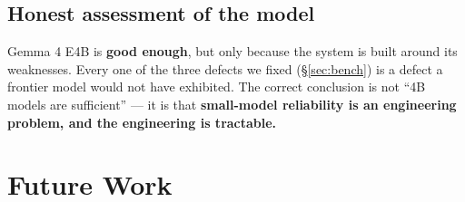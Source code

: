 \documentclass[11pt,a4paper]{article}
\begin{document}
\subsection*{Honest assessment of the model}

Gemma 4 E4B is \textbf{good enough}, but only because the system is built around its
weaknesses. Every one of the three defects we fixed (\S\ref{sec:bench}) is a defect a
frontier model would not have exhibited. The correct conclusion is not ``4B models are
sufficient'' --- it is that \textbf{small-model reliability is an engineering problem,
and the engineering is tractable.}

\section{Future Work}
\end{document}
